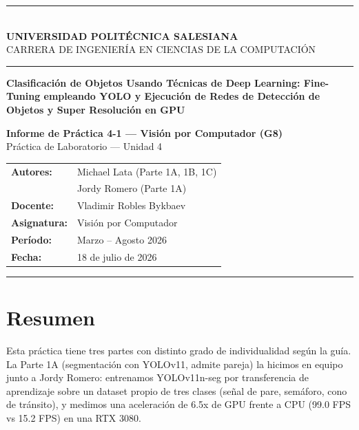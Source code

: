 \documentclass[12pt,a4paper]{article}
\begin{document}

\begin{titlepage}
  \centering
  \rule{\linewidth}{1.5pt}\\[0.4cm]
  {\large\bfseries UNIVERSIDAD POLITÉCNICA SALESIANA}\\[0.1cm]
  {\normalsize CARRERA DE INGENIERÍA EN CIENCIAS DE LA COMPUTACIÓN}\\[0.2cm]
  \rule{\linewidth}{0.8pt}

  \vspace{2cm}

  \parbox{0.85\textwidth}{\centering\LARGE\bfseries\color{salesiana}
    Clasificación de Objetos Usando Técnicas de Deep Learning: Fine-Tuning
    empleando YOLO y Ejecución de Redes de Detección de Objetos y
    Super Resolución en GPU
  }

  \vspace{1.5cm}

  {\large\bfseries Informe de Práctica 4-1 — Visión por Computador (G8)}\\[0.2cm]
  {\normalsize Práctica de Laboratorio — Unidad 4}

  \vspace{1.5cm}

  \begin{tabular}{ll}
    \textbf{Autores:}    & Michael Lata (Parte 1A, 1B, 1C) \\
                         & Jordy Romero (Parte 1A) \\[0.3cm]
    \textbf{Docente:}    & Vladimir Robles Bykbaev \\[0.3cm]
    \textbf{Asignatura:} & Visión por Computador \\[0.3cm]
    \textbf{Período:}    & Marzo -- Agosto 2026 \\[0.3cm]
    \textbf{Fecha:}      & 18 de julio de 2026 \\
  \end{tabular}

  \vfill
  \rule{\linewidth}{1.5pt}
\end{titlepage}

\section*{Resumen}

Esta práctica tiene tres partes con distinto grado de individualidad según la guía. La Parte 1A (segmentación con YOLOv11, admite pareja) la hicimos en equipo junto a Jordy Romero: entrenamos YOLOv11n-seg por transferencia de aprendizaje sobre un dataset propio de tres clases (señal de pare, semáforo, cono de tránsito), y medimos una aceleración de 6.5x de GPU frente a CPU (99.0 FPS vs 15.2 FPS) en una RTX 3080.
\end{document}

